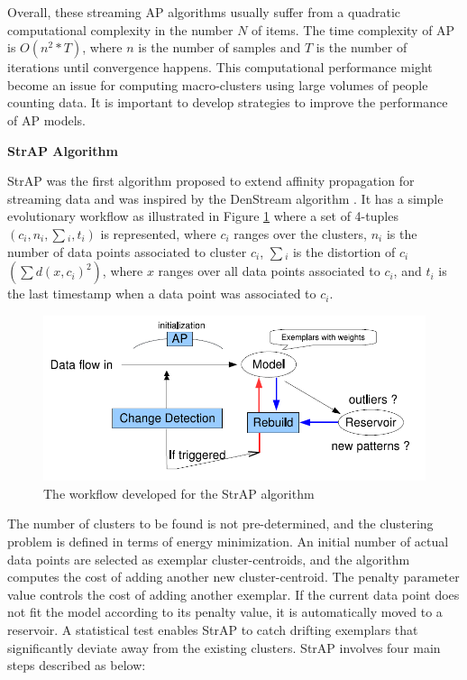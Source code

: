 
Overall, these streaming AP algorithms usually suffer from a quadratic computational complexity in the number $N$ of items. The time complexity of AP is $O(n^2*T)$, where $n$ is the number of samples and $T$ is the number of iterations until convergence happens\cite{refianti2017time}. This computational performance might become an issue for computing macro-clusters using large volumes of people counting data. It is important to develop strategies to improve the performance of AP models.

\vspace{7mm}
\hspace{-1 cm}
\textbf{StrAP Algorithm}

StrAP was the first algorithm proposed to extend affinity propagation for streaming data and was inspired by the DenStream algorithm \cite{zhang2008data}. It has a simple evolutionary workflow as illustrated in Figure \ref{stmodl} where a set of 4-tuples $(c_i,n_i,\sum{_i},t{_i})$ is represented, where  $c_i$ ranges over the clusters, $n_i$ is the number of data points associated to cluster $c_i$, $\sum{_i}$ is the distortion of $c_i$ $(\sum{d(x,c_i)^2})$, where $x$ ranges over all data points associated to $c_i$, and $t_i$ is the last timestamp when a data point was associated to $c_i$.


\begin{figure}[!ht]
\centering
\includegraphics[width = 13 cm]{image/Chapters/Chapter3/strapmodel.PNG}
\caption{The workflow developed for the StrAP algorithm }
\label{stmodl}
\end{figure}


The number of clusters to be found is not pre-determined, and the clustering problem is defined in terms of energy minimization. An initial number of actual data points are selected as exemplar cluster-centroids, and the algorithm computes the cost of adding another new cluster-centroid. The penalty parameter value controls the cost of adding another exemplar. If the current data point does not fit the model according to its penalty value, it is automatically moved to a reservoir. A statistical test enables StrAP to catch drifting exemplars that significantly deviate away from the existing clusters. StrAP involves four main steps described as below:  

